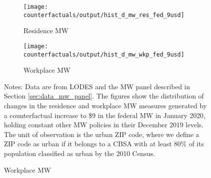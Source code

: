 \begin{figure}[h!]
    \centering
    \caption{Distribution of changes in minimum wage measures under a 
             counterfactual federal minimum wage of \$9, urban ZIP codes}
    \label{fig:cf_hist_res_and_wkp_mw}
    
    \begin{subfigure}{0.5\textwidth}
        \caption*{Residence MW}
        \texttt{[image: counterfactuals/output/hist\_d\_mw\_res\_fed\_9usd]}
    \end{subfigure}%
    \begin{subfigure}{0.5\textwidth}
        \caption*{Workplace MW}
        \texttt{[image: counterfactuals/output/hist\_d\_mw\_wkp\_fed\_9usd]}
    \end{subfigure}

    \begin{minipage}{.95\textwidth} \footnotesize
        \vspace{3mm}
        Notes:
        Data are from LODES and the MW panel described in Section
        \ref{sec:data_mw_panel}.
        The figures show the distribution of changes in the residence and 
        workplace MW measures generated by a counterfactual increase to \$9 
        in the federal MW in January 2020, holding constant other MW policies 
        in their December 2019 levels.
        The unit of observation is the urban ZIP code, where we define a ZIP code 
        as urban if it belongs to a CBSA with at least 80\% of its population 
        classified as urban by the 2010 Census.
    \end{minipage}
\end{figure}

